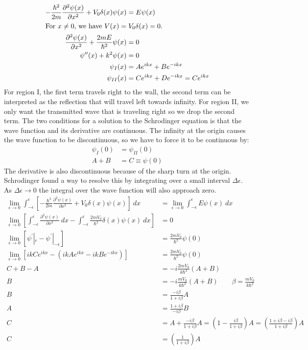 \documentclass{article}
\begin{document}
	\begin{align}
		-\frac{\hbar^2}{2m} \frac{\partial^2 \psi(x)}{\partial x^2} + V_0 \delta(x)\psi(x) &= E\psi(x) \\
		\intertext{For $x\neq0$, we have $V(x)=V_0 \delta(x)=0$.}
		\frac{\partial^2 \psi(x)}{\partial x^2} +  \frac{2mE}{\hbar^2}\psi(x) &= 0 \\
		\psi^{\prime\prime}(x) + k^2 \psi(x) &= 0 \nonumber \\ 
		\psi_I(x) &= Ae^{ikx} + Be^{-ikx} \\
		\psi_{II}(x) &= Ce^{ikx} + De^{-ikx} = Ce^{ikx}
	\end{align}
	For region I, the first term travels right to the wall, the second term can be interpreted as the reflection that will travel left towards infinity. For region II, we only want the transmitted wave that is traveling right so we drop the second term. The two conditions for a solution to the Schrodinger equation is that the wave function and its derivative are continuous. The infinity at the origin causes the wave function to be discontinuous, so we have to force it to be continuous by:
	\begin{align}
		\psi_I(0) &= \psi_{II}(0) \nonumber \\
		A + B &= C \equiv \psi(0)
	\end{align}
	The derivative is also discontinuous because of the sharp turn at the origin. Schrodinger found a way to resolve this by integrating over a small interval $\Delta \epsilon$. As $\Delta \epsilon \to 0$ the integral over the wave function will also approach zero.
	\begin{align}
		\lim_{\epsilon\to0} \int_{-\epsilon}^{\epsilon} \left[ -\frac{\hbar^2}{2m} \frac{\partial^2 \psi(x)}{\partial x^2} + V_0 \delta(x)\psi(x) \right] \ dx &= \lim_{\epsilon\to0} \int_{-\epsilon}^{\epsilon} E\psi(x) \ dx \\
		\lim_{\epsilon\to0}  \left[ \int_{-\epsilon}^{\epsilon} \frac{\partial^2 \psi(x)}{\partial x^2} \ dx - \int_{-\epsilon}^{\epsilon} \frac{2mV_0}{\hbar^2} \delta(x)\psi(x) \ dx \right] &= 0 \nonumber \\
		\lim_{\epsilon\to0} \left[ \psi^{\prime}|_\epsilon - \psi^{\prime}|_{-\epsilon} \right] &= \frac{2mV_0}{\hbar^2} \psi(0) \nonumber \\
		\lim_{\epsilon\to0} \left[ ikCe^{ikx} - \left( ikAe^{ikx} - ikBe^{-ikx} \right) \right] &= \frac{2mV_0}{\hbar^2} \psi(0) \nonumber \\
		C + B - A &= -i\frac{2mV_0}{k\hbar^2} \left( A + B \right) \nonumber \\
		B &= -i\frac{mV_0}{k\hbar^2} \left( A + B \right) \qquad \beta = \frac{mV_0}{k\hbar^2} \nonumber \\
		B &= \frac{-i\beta}{1 + i\beta} A \\
		A &= \frac{1 + i\beta}{-i\beta} B \\
		C &= A + \frac{-i\beta}{1 + i\beta} A = \left( 1 - \frac{i\beta}{1 + i\beta} \right) A = \left( \frac{1 + i\beta - i\beta}{1 + i\beta} \right) A \nonumber \\
		C &= \left( \frac{1}{1 + i\beta} \right) A \\
	\end{align}
\end{document}
